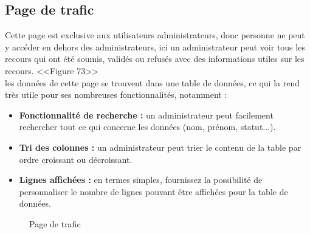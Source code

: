 \documentclass[12pt]{report}
\begin{document}
\newpage

\subsection{Page de trafic}

Cette page est exclusive aux utilisateurs administrateurs, donc personne ne peut y accéder en dehors des administrateurs, ici un administrateur peut voir tous les recours qui ont été soumis, validés ou refusés avec des informations utiles sur les recours. <<Figure 73>>
\\
les données de cette page se trouvent dans une table de données, ce qui la rend très utile pour ses nombreuses fonctionnalités, notamment :

\begin{itemize}
  \item \textbf{Fonctionnalité de recherche :} un administrateur peut facilement rechercher tout ce qui concerne les données (nom, prénom, statut...).
  \item \textbf{Tri des colonnes :} un administrateur peut trier le contenu de la table par ordre croissant ou décroissant.
  \item \textbf{Lignes affichées :} en termes simples, fournissez la possibilité de personnaliser le nombre de lignes pouvant être affichées pour la table de données.
\end{itemize}

\vspace{0.3in}

\begin{figure}[h]
\centering
\caption{Page de trafic}
\end{figure}
\end{document}
